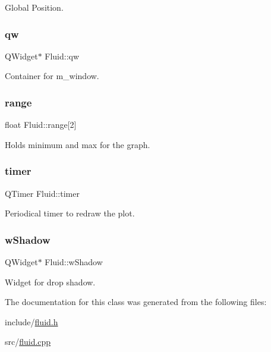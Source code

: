 Global Position. 

\mbox{\label{classFluid_a38ced692400072201566af41fd8fe5cd}} 
\subsubsection{\texorpdfstring{qw}{qw}}
{\footnotesize\ttfamily Q\+Widget$\ast$ Fluid\+::qw\hspace{0.3cm}{\ttfamily [private]}}



Container for m\+\_\+window. 

\mbox{\label{classFluid_a68eb81a3476d8aef975f151e209fe317}} 
\subsubsection{\texorpdfstring{range}{range}}
{\footnotesize\ttfamily float Fluid\+::range\mbox{[}2\mbox{]}\hspace{0.3cm}{\ttfamily [private]}}



Holds minimum and max for the graph. 

\mbox{\label{classFluid_a0765840a82e6ec401dea0cb65c435f5f}} 
\subsubsection{\texorpdfstring{timer}{timer}}
{\footnotesize\ttfamily Q\+Timer Fluid\+::timer\hspace{0.3cm}{\ttfamily [private]}}



Periodical timer to redraw the plot. 

\mbox{\label{classFluid_a55892004855abbf3458402a674add0e4}} 
\subsubsection{\texorpdfstring{wShadow}{wShadow}}
{\footnotesize\ttfamily Q\+Widget$\ast$ Fluid\+::w\+Shadow\hspace{0.3cm}{\ttfamily [private]}}



Widget for drop shadow. 



The documentation for this class was generated from the following files\+:\begin{DoxyCompactItemize}
\item 
include/\mbox{\hyperlink{fluid_8h}{fluid.\+h}}\item 
src/\mbox{\hyperlink{fluid_8cpp}{fluid.\+cpp}}\end{DoxyCompactItemize}
